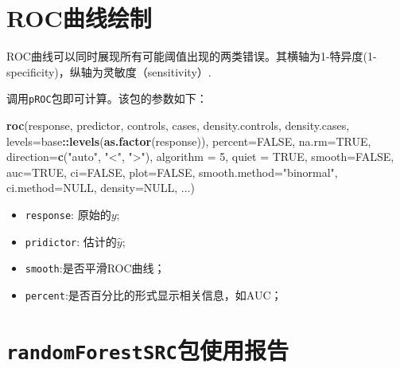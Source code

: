 \documentclass[
]{book}
\newenvironment{Shaded}{\begin{snugshade}}{\end{snugshade}}
\newcommand{\DataTypeTok}[1]{\textcolor[rgb]{0.13,0.29,0.53}{#1}}
\newcommand{\DecValTok}[1]{\textcolor[rgb]{0.00,0.00,0.81}{#1}}
\newcommand{\KeywordTok}[1]{\textcolor[rgb]{0.13,0.29,0.53}{\textbf{#1}}}
\newcommand{\NormalTok}[1]{#1}
\newcommand{\OperatorTok}[1]{\textcolor[rgb]{0.81,0.36,0.00}{\textbf{#1}}}
\newcommand{\OtherTok}[1]{\textcolor[rgb]{0.56,0.35,0.01}{#1}}
\newcommand{\StringTok}[1]{\textcolor[rgb]{0.31,0.60,0.02}{#1}}
\providecommand{\tightlist}{%
  \setlength{\itemsep}{0pt}\setlength{\parskip}{0pt}}
\begin{document}
\hypertarget{rocux66f2ux7ebfux7ed8ux5236}{%
\section{ROC曲线绘制}\label{rocux66f2ux7ebfux7ed8ux5236}}

ROC曲线可以同时展现所有可能阈值出现的两类错误。其横轴为1-特异度(1-specificity)，纵轴为灵敏度（sensitivity）.

调用\texttt{pROC}包即可计算。该包的参数如下：

\begin{Shaded}
\begin{Highlighting}[]
\KeywordTok{roc}\NormalTok{(response, predictor, controls, cases,}
\NormalTok{density.controls, density.cases,}
\DataTypeTok{levels=}\NormalTok{base}\OperatorTok{::}\KeywordTok{levels}\NormalTok{(}\KeywordTok{as.factor}\NormalTok{(response)), }\DataTypeTok{percent=}\OtherTok{FALSE}\NormalTok{, }\DataTypeTok{na.rm=}\OtherTok{TRUE}\NormalTok{,}
\DataTypeTok{direction=}\KeywordTok{c}\NormalTok{(}\StringTok{"auto"}\NormalTok{, }\StringTok{"<"}\NormalTok{, }\StringTok{">"}\NormalTok{), }\DataTypeTok{algorithm =} \DecValTok{5}\NormalTok{, }\DataTypeTok{quiet =} \OtherTok{TRUE}\NormalTok{, }
\DataTypeTok{smooth=}\OtherTok{FALSE}\NormalTok{, }\DataTypeTok{auc=}\OtherTok{TRUE}\NormalTok{, }\DataTypeTok{ci=}\OtherTok{FALSE}\NormalTok{, }\DataTypeTok{plot=}\OtherTok{FALSE}\NormalTok{, }\DataTypeTok{smooth.method=}\StringTok{"binormal"}\NormalTok{,}
\DataTypeTok{ci.method=}\OtherTok{NULL}\NormalTok{, }\DataTypeTok{density=}\OtherTok{NULL}\NormalTok{, ...)}
\end{Highlighting}
\end{Shaded}

\begin{itemize}
\tightlist
\item
  \texttt{response}: 原始的\(y\);
\item
  \texttt{pridictor}: 估计的\(\hat y\);
\item
  \texttt{smooth}:是否平滑ROC曲线；
\item
  \texttt{percent}:是否百分比的形式显示相关信息，如AUC；
\end{itemize}

\hypertarget{randomforestsrcux5305ux4f7fux7528ux62a5ux544a}{%
\section{\texorpdfstring{\texttt{randomForestSRC}包使用报告}{randomForestSRC包使用报告}}\label{randomforestsrcux5305ux4f7fux7528ux62a5ux544a}}
\end{document}
